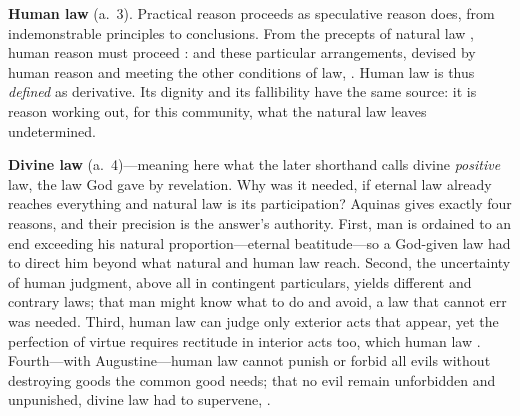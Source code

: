 \textbf{Human law} (a.~3). Practical reason proceeds as speculative reason does, from indemonstrable principles to conclusions. From the precepts of natural law , human reason must proceed : and these particular arrangements, devised by human reason and meeting the other conditions of law, . Human law is thus \emph{defined} as derivative. Its dignity and its fallibility have the same source: it is reason working out, for this community, what the natural law leaves undetermined.

\textbf{Divine law} (a.~4)---meaning here what the later shorthand calls divine \emph{positive} law, the law God gave by revelation. Why was it needed, if eternal law already reaches everything and natural law is its participation? Aquinas gives exactly four reasons, and their precision is the answer's authority. First, man is ordained to an end exceeding his natural proportion---eternal beatitude---so a God-given law had to direct him beyond what natural and human law reach. Second, the uncertainty of human judgment, above all in contingent particulars, yields different and contrary laws; that man might know  what to do and avoid, a law that cannot err was needed. Third, human law can judge only exterior acts that appear, yet the perfection of virtue requires rectitude in interior acts too, which human law . Fourth---with Augustine---human law cannot punish or forbid all evils without destroying goods the common good needs; that no evil remain unforbidden and unpunished, divine law had to supervene, .

